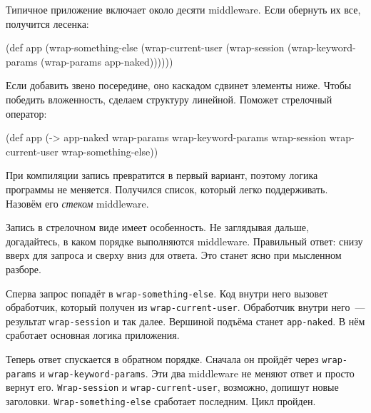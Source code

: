 Типичное приложение включает около десяти middleware. Если обернуть их все,
получится лесенка:

\begin{english}
  \begin{clojure}
(def app
  (wrap-something-else
    (wrap-current-user
      (wrap-session
        (wrap-keyword-params
          (wrap-params app-naked))))))
  \end{clojure}
\end{english}


Если добавить звено посередине, оно каскадом сдвинет элементы ниже. Чтобы
победить вложенность, сделаем структуру линейной. Поможет стрелочный оператор:


\begin{english}
  \begin{clojure/lines}
(def app
  (-> app-naked
      wrap-params
      wrap-keyword-params
      wrap-session
      wrap-current-user
      wrap-something-else))
  \end{clojure/lines}
\end{english}


При компиляции запись превратится в первый вариант, поэтому логика программы не
меняется. Получился список, который легко поддерживать. Назовём его
\emph{стеком} middleware.

Запись в стрелочном виде имеет особенность. Не заглядывая дальше, догадайтесь, в
каком порядке выполняются middleware. Правильный ответ: снизу вверх для запроса
и сверху вниз для ответа. Это станет ясно при мысленном разборе.


\mnoindent
Сперва запрос попадёт в \verb|wrap-something-else|. Код внутри него
вызовет обработчик, который получен из \verb|wrap-current-user|. Обработчик
внутри него~--- результат \verb|wrap-session| и так далее. Вершиной подъёма
станет \verb|app-naked|. В нём сработает основная логика приложения.

Теперь ответ спускается в обратном порядке. Сначала он пройдёт через
\verb|wrap-params| и \verb|wrap-keyword-params|. Эти два middleware не
меняют ответ и просто вернут его. \verb|Wrap-session| и
\verb|wrap-current-user|, возможно, допишут новые заголовки.
\verb|Wrap-something-else| сработает последним. Цикл пройден.

